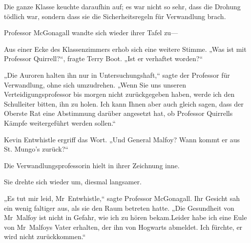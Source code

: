Die ganze Klasse keuchte daraufhin auf; es war nicht so sehr, dass die Drohung tödlich war, sondern dass sie die Sicherheitsregeln für Verwandlung brach.

Professor McGonagall wandte sich wieder ihrer Tafel zu—

Aus einer Ecke des Klassenzimmers erhob sich eine weitere Stimme. „Was ist mit Professor Quirrell?“, fragte Terry Boot. „Ist er verhaftet worden?“

„Die Auroren halten ihn nur in Untersuchungshaft,“ sagte der Professor für Verwandlung, ohne sich umzudrehen. „Wenn Sie uns unseren Verteidigungsprofessor bis morgen nicht zurückgegeben haben, werde ich den Schulleiter bitten, ihn zu holen. Ich kann Ihnen aber auch gleich sagen, dass der Oberste Rat eine Abstimmung darüber angesetzt hat, ob Professor Quirrells Kämpfe weitergeführt werden sollen.“

Kevin Entwhistle ergriff das Wort. „Und General Malfoy? Wann kommt er aus St. Mungo's zurück?“

Die Verwandlungsprofessorin hielt in ihrer Zeichnung inne.

Sie drehte sich wieder um, diesmal langsamer.

„Es tut mir leid, Mr~Entwhistle,“ sagte Professor McGonagall. Ihr Gesicht sah ein wenig faltiger aus, als sie den Raum betreten hatte. „Die Gesundheit von Mr~Malfoy ist nicht in Gefahr, wie ich zu hören bekam.Leider habe ich eine Eule von Mr~Malfoys Vater erhalten, der ihn von Hogwarts abmeldet. Ich fürchte, er wird nicht zurückkommen.“
